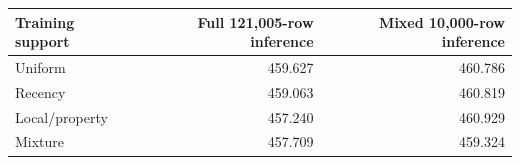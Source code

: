 \begin{tabular}{lrr}
\toprule
Training support & Full 121,005-row inference & Mixed 10,000-row inference \\
\midrule
Uniform & 459.627 & 460.786 \\
Recency & 459.063 & 460.819 \\
Local/property & 457.240 & 460.929 \\
Mixture & 457.709 & 459.324 \\
\bottomrule
\end{tabular}
